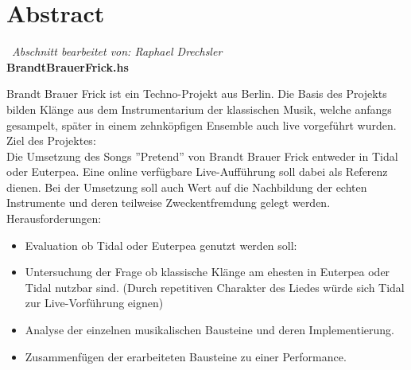 \documentclass[
10pt, %
a4paper, %
oneside, %
headinclude,footinclude, %
BCOR5mm, %
]{scrartcl}
\begin{document}
\tableofcontents %





\newpage %

\section{Abstract}\
\textit{Abschnitt bearbeitet von: Raphael Drechsler}\\

\noindent \textbf{BrandtBrauerFrick.hs}

\noindent Brandt Brauer Frick ist ein Techno-Projekt aus Berlin.
Die Basis des Projekts bilden Klänge aus dem Instrumentarium der
klassischen Musik, welche anfangs gesampelt, später in einem zehnköpfigen
Ensemble auch live vorgeführt wurden.\cite{Wiki}\\ 

\noindent Ziel des Projektes:\\
Die Umsetzung des Songs ''Pretend'' von Brandt Brauer Frick entweder in
Tidal oder Euterpea. Eine online verfügbare Live-Aufführung \cite{YT1} soll dabei als Referenz dienen. Bei der Umsetzung soll auch Wert auf die Nachbildung der echten Instrumente und deren teilweise Zweckentfremdung gelegt werden.\\

\noindent Herausforderungen:
\begin{itemize}
	\itemsep0em
	\item Evaluation ob Tidal\cite{Tidal} oder Euterpea\cite{Euterpea} genutzt werden soll:
	\item Untersuchung der Frage ob klassische Klänge am ehesten in Euterpea oder
	Tidal nutzbar sind. (Durch repetitiven Charakter des Liedes würde sich Tidal zur
	Live-Vorführung eignen)
	\item Analyse der einzelnen musikalischen Bausteine und deren Implementierung.
	\item Zusammenfügen der erarbeiteten Bausteine zu einer Performance.
\end{itemize}
\end{document}
